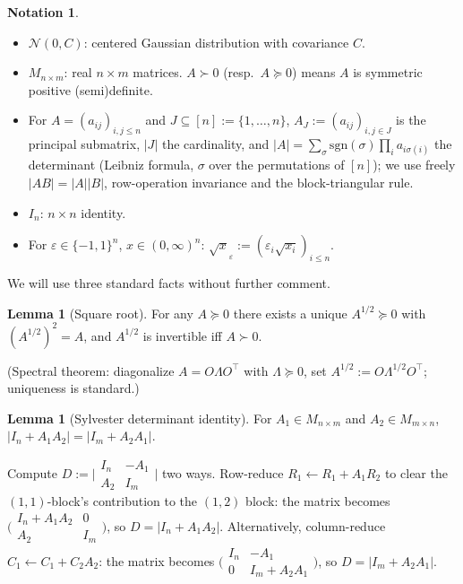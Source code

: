 \documentclass[14pt]{extarticle}
\makeatletter
\theoremstyle{definition}
\newtheorem{lemma}[theorem]{Lemma}
\newtheorem{notation}[theorem]{Notation}
\renewenvironment{proof}[1][\proofname]{\par
  \pushQED{\qed}%
  \normalfont \topsep6\p@\@plus6\p@\relax
  \trivlist
  \item[\hskip\labelsep\bfseries #1\@addpunct{.}]\ignorespaces
}{%
  \popQED\endtrivlist\@endpefalse
}
\newcommand{\caln}{\mathcal{N}}
\makeatother
\begin{document}
\begin{notation}\label{not:conventions}
  \leavevmode
  \begin{itemize}[nosep]
    \item $\caln(0,C)$: centered Gaussian distribution with covariance
      $C$.
    \item $M_{n\times m}$: real $n\times m$ matrices.  $A\succ 0$
      (resp.\ $A\succcurlyeq 0$) means $A$ is symmetric positive
      (semi)definite.
    \item For $A=(a_{ij})_{i,j\leqslant n}$ and
      $J\subseteq[n]:=\{1,\ldots,n\}$,
      $A_J:=(a_{ij})_{i,j\in J}$ is the principal submatrix,
      $|J|$ the cardinality, and $|A|=\sum_{\sigma}\mathrm{sgn}(\sigma)\prod_i a_{i\sigma(i)}$
      the determinant (Leibniz formula, $\sigma$ over the permutations of $[n]$);
      we use freely $|AB|=|A||B|$, row-operation invariance and the
      block-triangular rule.
    \item $I_n$: $n\times n$ identity.
    \item For $\varepsilon\in\{-1,1\}^n$, $x\in(0,\infty)^n$:
      $\sqrt{x}_\varepsilon:=(\varepsilon_i\sqrt{x_i})_{i\leqslant n}$.
  \end{itemize}
\end{notation}

We will use three standard facts without further comment.

\begin{lemma}[Square root]\label{lem:sqrt}
  For any $A\succcurlyeq 0$ there exists a unique $A^{1/2}\succcurlyeq 0$ with
  $(A^{1/2})^2=A$, and $A^{1/2}$ is invertible iff $A\succ 0$.
\end{lemma}

(Spectral theorem: diagonalize $A=O\Lambda O^\top$ with $\Lambda\succcurlyeq 0$,
set $A^{1/2}:=O\Lambda^{1/2}O^\top$; uniqueness is standard.)

\begin{lemma}[Sylvester determinant identity]\label{lem:sylvester}
  For $A_1\in M_{n\times m}$ and $A_2\in M_{m\times n}$,
  $|I_n+A_1A_2|=|I_m+A_2A_1|$.
\end{lemma}

\begin{proof}
  Compute $D:=\bigl|\begin{smallmatrix}I_n & -A_1\\ A_2 &
  I_m\end{smallmatrix}\bigr|$ two ways.  Row-reduce $R_1\leftarrow
  R_1+A_1R_2$ to clear the $(1,1)$-block's contribution to the $(1,2)$
  block: the matrix becomes
  $\bigl(\begin{smallmatrix}I_n+A_1A_2 & 0\\ A_2 & I_m\end{smallmatrix}\bigr)$,
  so $D=|I_n+A_1A_2|$.  Alternatively, column-reduce $C_1\leftarrow
  C_1+C_2A_2$: the matrix becomes
  $\bigl(\begin{smallmatrix}I_n & -A_1\\ 0 & I_m+A_2A_1\end{smallmatrix}\bigr)$,
  so $D=|I_m+A_2A_1|$.
\end{proof}
\end{document}
